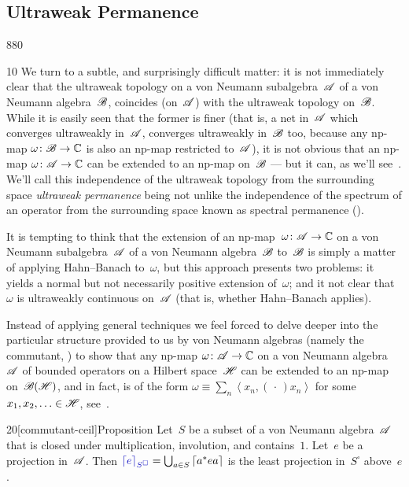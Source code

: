 \subsection{Ultraweak Permanence}
\begin{parsec}{880}%
\begin{point}{10}%
We turn to 
a subtle, and surprisingly difficult matter:
it is not immediately clear
that the ultraweak topology on a von Neumann
subalgebra~$\mathscr{A}$ of a von Neumann algebra~$\mathscr{B}$,
coincides (on~$\mathscr{A}$) with the ultraweak topology on~$\mathscr{B}$.
While it is easily seen that the former is finer
(that is, a net in~$\mathscr{A}$ which converges ultraweakly in~$\mathscr{A}$,
converges ultraweakly in~$\mathscr{B}$ too, because any np-map 
$\omega\colon \mathscr{B}\to\mathbb{C}$ is also an np-map restricted to~$\mathscr{A}$),
it is not obvious that an np-map $\omega\colon \mathscr{A}\to\mathbb{C}$
can be extended to an np-map on~$\mathscr{B}$
--- but it can, as we'll see~.
We'll call this independence of the ultraweak topology
from the surrounding space
\emph{ultraweak permanence}
being not unlike the independence
of the spectrum of an operator from the surrounding space
known as spectral permanence ().


It is tempting to think that the extension of an np-map~$\omega\colon \mathscr{A}
\to\mathbb{C}$
on a von Neumann
subalgebra~$\mathscr{A}$ of a von Neumann algebra~$\mathscr{B}$
to~$\mathscr{B}$ is simply a matter of applying Hahn--Banach to~$\omega$,
but this approach presents two problems:
it yields a normal but not necessarily positive extension
of~$\omega$;
and it not clear that~$\omega$ is ultraweakly continuous
on~$\mathscr{A}$ (that is, whether Hahn--Banach applies).

Instead of applying general techniques we feel forced
to delve deeper
into the particular structure 
provided to us by von Neumann algebras
(namely the commutant, )
to show that any np-map
$\omega\colon \mathscr{A}\to\mathbb{C}$
on a von Neumann algebra~$\mathscr{A}$
of bounded operators on a Hilbert space~$\mathscr{H}$
can be extended to an np-map on~$\mathscr{B}(\mathscr{H})$,
and in fact, is of the form
$\omega\equiv \sum_n \left<x_n,(\,\cdot\,)x_n\right>$
for some $x_1,x_2,\dotsc \in\mathscr{H}$, see~.
\end{point}
\begin{point}{20}[commutant-ceil]{Proposition}%
Let~$S$ be a subset of a von Neumann algebra~$\mathscr{A}$
that is closed under multiplication, involution, and contains~$1$.
Let~$e$ be a projection in~$\mathscr{A}$.
Then $\Define{\ceil{e}_{S^\square}}= 
\bigcup_{a\in S} \ceil{a^* e a}$%
is the least projection in~$S^\square$
above~$e$.


\end{point}
\end{parsec}
